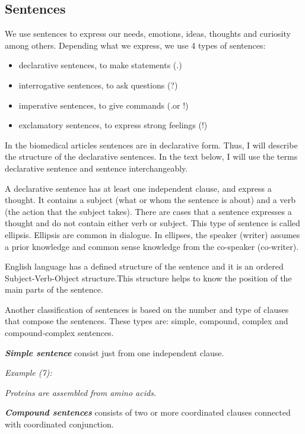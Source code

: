 \subsection{Sentences}

We use sentences to express our needs, emotions, ideas, thoughts and curiosity among others. Depending what we express, we use 4 types of sentences: 
\begin{itemize}
	\item declarative sentences, to make statements (.)
	\item interrogative sentences, to ask questions (?)
	\item imperative sentences, to give commands (.or !)
	\item exclamatory sentences, to express strong feelings (!)
\end{itemize}

In the biomedical articles sentences are in declarative form. Thus, I will describe the structure of the declarative sentences. In the text below, I will use the terms declarative sentence and sentence interchangeably.

A declarative sentence has at least one independent clause, and express a thought. It contains a subject (what or whom the sentence is about) and a verb (the action that the subject takes). There are cases that a sentence expresses a thought and do not contain either verb or subject. This type of sentence is called ellipsis. Ellipsis are common in dialogue. In ellipses, the speaker (writer) assumes a prior knowledge and common sense knowledge from the co-speaker (co-writer).

English language has a defined structure of the sentence and it is an ordered Subject-Verb-Object structure.This structure helps to know the position of the main parts of the sentence.
 
Another classification of sentences is based on the number and type of clauses that compose the sentences. These types are: simple, compound, complex and compound-complex sentences.

\emph{\textbf{Simple sentence}} consist just from one independent clause.  

\emph{Example (7):}
\begin{changemargin}{10mm}{10mm} 
   \emph{Proteins are assembled from amino acids.}
\end{changemargin} 
\vspace{3mm}

\emph{\textbf{Compound sentences}} consists of two or more coordinated clauses connected with coordinated conjunction.\\

